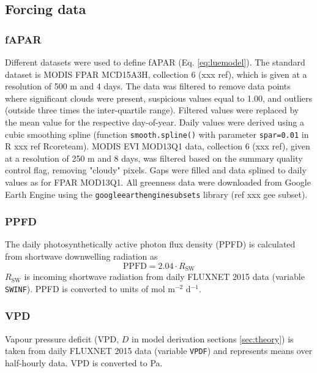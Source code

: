 \documentclass{myreport}
\begin{document}
\subsection{Forcing data}

\subsubsection{fAPAR}
\label{sec:greennessdata}

Different datasets were used to define fAPAR (Eq. \ref{eq:luemodel}). The standard dataset is MODIS FPAR MCD15A3H, collection 6 (xxx ref), which is given at a resolution of 500 m and 4 days. The data was filtered to remove data points where significant clouds were present, suspicious values equal to 1.00, and outliers (outside three times the inter-quartile range). Filtered values were replaced by the mean value for the respective day-of-year. Daily values were derived using a cubic smoothing spline (function \texttt{smooth.spline()} with parameter \texttt{spar=0.01} in R xxx ref Rcoreteam). MODIS EVI MOD13Q1 data, collection 6 (xxx ref), given at a resolution of 250 m and 8 days, was filtered based on the summary quality control flag, removing "cloudy" pixels. Gaps were filled and data splined to daily values as for FPAR MOD13Q1. All greenness data were downloaded from Google Earth Engine using the \texttt{google\textunderscore earth\textunderscore engine\textunderscore subsets} library (ref xxx gee subset). 

\subsubsection{PPFD}
\label{sec:ppfd}

The daily photosynthetically active photon flux density (PPFD) is calculated from shortwave downwelling radiation as 
\begin{equation}
    \text{PPFD} = 2.04 \cdot R_{\text{SW}} 
\end{equation}
$R_{\text{SW}}$ is incoming shortwave radiation from daily FLUXNET 2015 data (variable \texttt{SW\textunderscore IN\textunderscore F}). PPFD is converted to units of mol m$^{-2}$ d$^{-1}$.

\subsubsection{VPD}
\label{sec:vpd}

Vapour pressure deficit (VPD, $D$ in model derivation sections \ref{sec:theory}) is taken from daily FLUXNET 2015 data (variable \texttt{VPD\textunderscore F}) and represents means over half-hourly data. VPD is converted to Pa. 
\end{document}
